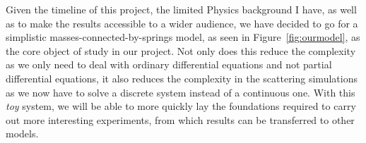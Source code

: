 Given the timeline of this project, the limited Physics background I have, as
well as to make the results accessible to a wider audience, we have decided to
go for a simplistic masses-connected-by-springs model, as seen in
Figure~\ref{fig:ourmodel}, as the core object of study in our project. Not only
does this reduce the complexity as we only need to deal with ordinary
differential equations and not partial differential equations, it also reduces
the complexity in the scattering simulations as we now have to solve a discrete
system instead of a continuous one. With this \textit{toy} system, we will be
able to more quickly lay the foundations required to carry out more interesting
experiments, from which results can be transferred to other models.
